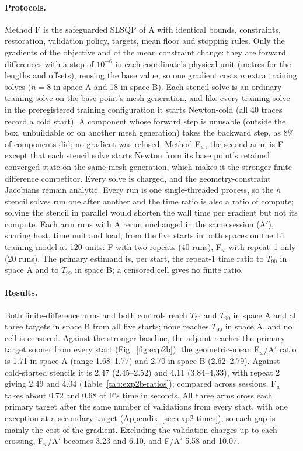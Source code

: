 \paragraph{Protocols.}
Method F is the safeguarded SLSQP of A with identical bounds, constraints,
restoration, validation policy, targets, mean floor and stopping rules.
Only the gradients of the objective and of the mean constraint change: they
are forward differences with a step of $10^{-6}$ in each coordinate's
physical unit (metres for the lengths and offsets), reusing the base value,
so one gradient costs $n$ extra training solves ($n=8$ in space A and 18 in
space B). Each stencil solve is an ordinary training solve on the base
point's mesh generation, and like every training solve in the
preregistered training configuration it starts Newton-cold (all 40 traces
record a cold start). A component whose forward step is unusable
(outside the box, unbuildable or on another mesh generation) takes the
backward step, as 8\% of components did; no gradient was refused. Method
F$_w$, the second arm, is F except that each stencil solve starts Newton
from its base point's retained converged state on the same mesh generation,
which makes it the stronger finite-difference competitor. Every solve is
charged, and the geometry-constraint Jacobians remain analytic. Every run is
one single-threaded process, so the $n$ stencil solves run one after
another and the time ratio is also a ratio of compute; solving the stencil
in parallel would shorten the wall time per gradient but not its compute.
Each arm runs with A rerun unchanged in the same session (A$'$), sharing
host, time unit and load, from the five starts in both spaces on the L1
training model at 120 units: F with two repeats (40 runs), F$_w$ with
repeat~1 only (20 runs). The primary estimand is, per start, the repeat-1
time ratio to $T_{90}$ in space A and to $T_{99}$ in space B; a censored
cell gives no finite ratio.

\paragraph{Results.}
Both finite-difference arms and both controls reach $T_{50}$ and $T_{90}$
in space A and all three targets in space B from all five starts; none
reaches $T_{99}$ in space A, and no cell is censored. Against the stronger
baseline, the adjoint reaches the primary target sooner from every start
(Fig.~\ref{fig:exp2b}): the geometric-mean F$_w$/A$'$ ratio is 1.71 in
space A (range 1.68--1.77) and 2.70 in space B (2.62--2.79). Against
cold-started stencils it is 2.47 (2.45--2.52) and 4.11 (3.84--4.33), with
repeat 2 giving 2.49 and 4.04 (Table~\ref{tab:exp2b-ratios}); compared
across sessions, F$_w$ takes about 0.72 and 0.68 of F's time in seconds.
All three arms cross each primary target after the same number of
validations from every start, with one exception at a secondary target
(Appendix~\ref{sec:exp2-times}), so each gap is mainly the cost of the
gradient. Excluding the validation charges up to each crossing, F$_w$/A$'$
becomes 3.23 and 6.10, and F/A$'$ 5.58 and 10.07.

